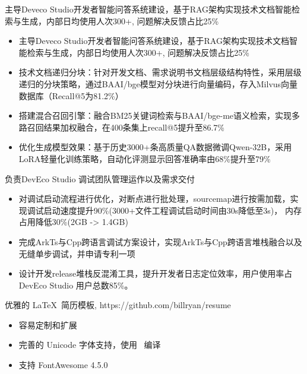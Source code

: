 \documentclass{resume}
\begin{document}
\begin{onehalfspacing}
主导Deveco Studio开发者智能问答系统建设，基于RAG架构实现技术文档智能检索与生成，内部日均使用人次300+, 问题解决反馈占比25\%
\begin{itemize}
  \item 主导Deveco Studio开发者智能问答系统建设，基于RAG架构实现技术文档智能检索与生成，内部日均使用人次300+, 问题解决反馈占比25\%
  \item 技术文档递归分块：针对开发文档、需求说明书文档层级结构特性，采用层级递归的分块策略，通过BAAI/bge模型对分块进行向量编码，存入Milvus向量数据库（Recall@5为81.2\%）
  \item 搭建混合召回引擎：融合BM25关键词检索与BAAI/bge-me语义检索，实现多路召回结果加权融合，在400条集上recall@5提升至86.7\%
  \item 优化生成模型效果：基于历史3000+条高质量QA数据微调Qwen-32B，采用LoRA轻量化训练策略，自动化评测显示回答准确率由68\%提升至79\%
\end{itemize}

\begin{onehalfspacing}
负责DevEco Studio 调试团队管理运作以及需求交付
\begin{itemize}
  \item 对调试启动流程进行优化，对断点进行批处理，sourcemap进行按需加载，实现调试启动速度提升90\%(3000+文件工程调试启动时间由30s降低至3s)， 内存占用降低30\%(2GB -> 1.4GB)
  \item 完成ArkTs与Cpp跨语言调试方案设计，实现ArkTs与Cpp跨语言堆栈融合以及无缝单步调试，并申请专利一项
  \item 设计开发release堆栈反混淆工具，提升开发者日志定位效率，用户使用率占DevEco Studio 用户总数85\%。
\end{itemize}
\end{onehalfspacing}

\begin{onehalfspacing}
优雅的 \LaTeX\ 简历模板, https://github.com/billryan/resume
\begin{itemize}
  \item 容易定制和扩展
  \item 完善的 Unicode 字体支持，使用 \XeLaTeX\ 编译
  \item 支持 FontAwesome 4.5.0
\end{itemize}
\end{onehalfspacing}


\end{onehalfspacing}
\end{document}
